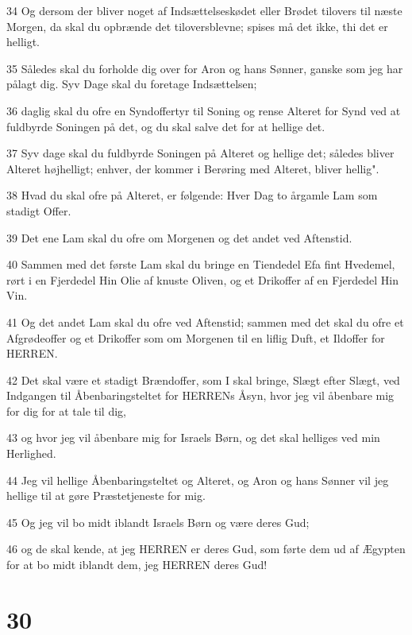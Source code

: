 \par 34 Og dersom der bliver noget af Indsættelseskødet eller Brødet tilovers til næste Morgen, da skal du opbrænde det tiloversblevne; spises må det ikke, thi det er helligt.
\par 35 Således skal du forholde dig over for Aron og hans Sønner, ganske som jeg har pålagt dig. Syv Dage skal du foretage Indsættelsen;
\par 36 daglig skal du ofre en Syndoffertyr til Soning og rense Alteret for Synd ved at fuldbyrde Soningen på det, og du skal salve det for at hellige det.
\par 37 Syv dage skal du fuldbyrde Soningen på Alteret og hellige det; således bliver Alteret højhelligt; enhver, der kommer i Berøring med Alteret, bliver hellig".
\par 38 Hvad du skal ofre på Alteret, er følgende: Hver Dag to årgamle Lam som stadigt Offer.
\par 39 Det ene Lam skal du ofre om Morgenen og det andet ved Aftenstid.
\par 40 Sammen med det første Lam skal du bringe en Tiendedel Efa fint Hvedemel, rørt i en Fjerdedel Hin Olie af knuste Oliven, og et Drikoffer af en Fjerdedel Hin Vin.
\par 41 Og det andet Lam skal du ofre ved Aftenstid; sammen med det skal du ofre et Afgrødeoffer og et Drikoffer som om Morgenen til en liflig Duft, et Ildoffer for HERREN.
\par 42 Det skal være et stadigt Brændoffer, som I skal bringe, Slægt efter Slægt, ved Indgangen til Åbenbaringsteltet for HERRENs Åsyn, hvor jeg vil åbenbare mig for dig for at tale til dig,
\par 43 og hvor jeg vil åbenbare mig for Israels Børn, og det skal helliges ved min Herlighed.
\par 44 Jeg vil hellige Åbenbaringsteltet og Alteret, og Aron og hans Sønner vil jeg hellige til at gøre Præstetjeneste for mig.
\par 45 Og jeg vil bo midt iblandt Israels Børn og være deres Gud;
\par 46 og de skal kende, at jeg HERREN er deres Gud, som førte dem ud af Ægypten for at bo midt iblandt dem, jeg HERREN deres Gud!

\chapter{30}

